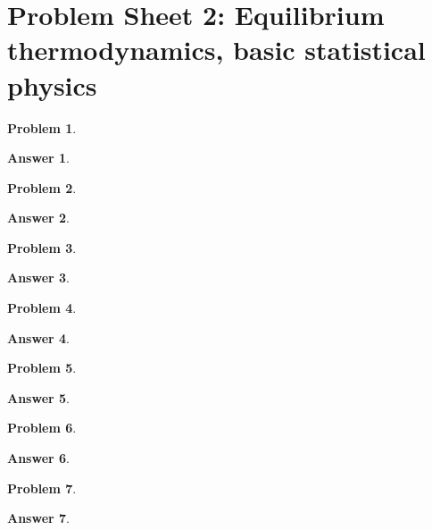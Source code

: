 \documentclass[a4paper]{article}
\newtheorem{ans}{Answer}[section]
\theoremstyle{new}
\newtheorem{qns}{Problem}[section]
\begin{document}
\section{Problem Sheet 2: Equilibrium thermodynamics, basic statistical physics}
\begin{qns}

\end{qns}
\begin{ans}

\end{ans}
\begin{qns}

\end{qns}
\begin{ans}

\end{ans}
\newpage
\begin{qns}

\end{qns}
\begin{ans}

\end{ans}
\begin{qns}

\end{qns}
\begin{ans}

\end{ans}
\newpage
\begin{qns}

\end{qns}
\begin{ans}

\end{ans}
\begin{qns}

\end{qns}
\begin{ans}

\end{ans}
\newpage
\begin{qns}

\end{qns}
\begin{ans}

\end{ans}
\newpage
\end{document}
